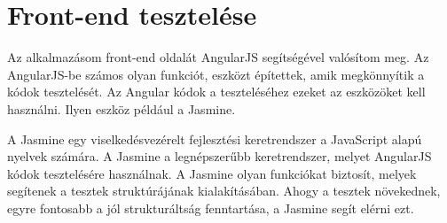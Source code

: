 \section{Front-end tesztelése}

Az alkalmazásom front-end oldalát AngularJS segítségével valósítom meg. Az AngularJS-be számos olyan funkciót, eszközt építettek, amik megkönnyítik a kódok tesztelését. Az Angular kódok a teszteléséhez ezeket az eszközöket kell használni. Ilyen eszköz például a Jasmine.

A Jasmine egy viselkedésvezérelt fejlesztési keretrendszer a JavaScript alapú nyelvek számára. A Jasmine a legnépszerűbb keretrendszer, melyet AngularJS kódok tesztelésére használnak. A Jasmine olyan funkciókat biztosít, melyek segítenek a tesztek struktúrájának kialakításában. Ahogy a tesztek növekednek, egyre fontosabb a jól strukturáltság fenntartása, a Jasmine segít elérni ezt.
